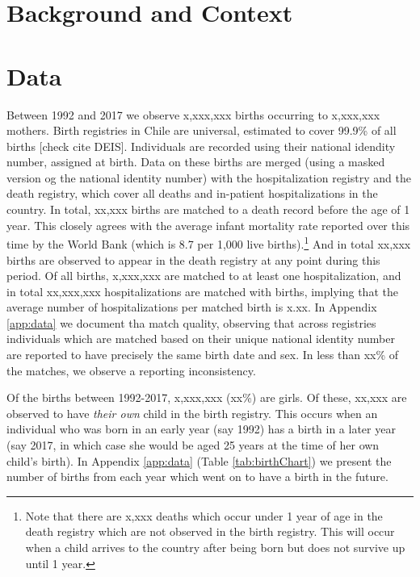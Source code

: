 \documentclass[11pt]{article}
\begin{document}
\begin{spacing}{1.5}
  
  \clearpage
  \section{Background and Context}
  
  
  
  \clearpage
  \section{Data}
  Between 1992 and 2017 we observe x,xxx,xxx births occurring to x,xxx,xxx mothers.  Birth registries in Chile are universal, estimated to cover 99.9\% of all births [check cite DEIS].  Individuals are recorded using their national idendity number, assigned at birth. Data on these births are merged (using a masked version og the national identity number) with the hospitalization registry and the death registry, which cover all deaths and in-patient hospitalizations in the country.  In total, xx,xxx births are matched to a death record before the age of 1 year. This closely agrees with the average infant mortality rate reported over this time by the World Bank (which is 8.7 per 1,000 live births).\footnote{Note that there are x,xxx deaths which occur under 1 year of age in the death registry which are not observed in the birth registry. This will occur when a child arrives to the country after being born but does not survive up until 1 year.}  And in total xx,xxx births are observed to appear in the death registry at any point during this period.  Of all births, x,xxx,xxx are matched to at least one hospitalization, and in total xx,xxx,xxx hospitalizations are matched with births, implying that the average number of hospitalizations per matched birth is x.xx.  In Appendix \ref{app:data} we document tha match quality, observing that across registries individuals which are matched based on their unique national identity number are reported to have precisely the same birth date and sex.  In less than xx\% of the matches, we observe a reporting inconsistency.

  Of the births between 1992-2017, x,xxx,xxx (xx\%) are girls.  Of these, xx,xxx are observed to have \emph{their own} child in the birth registry.  This occurs when an individual who was born in an early year (say 1992) has a birth in a later year (say 2017, in which case she would be aged 25 years at the time of her own child's birth).  In Appendix \ref{app:data} (Table \ref{tab:birthChart}) we present the number of births from each year which went on to have a birth in the future.


\end{spacing}
\end{document}
